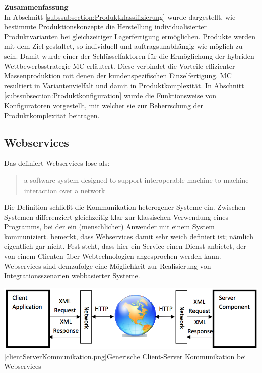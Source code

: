 \documentclass[12pt,a4paper,bibliography=totocnumbered,listof=totoc]{scrartcl}
\begin{document}
\textbf{Zusammenfassung}\\
In Abschnitt \ref{subssubsection:Produktklassifizierung} wurde dargestellt, wie bestimmte Produktionskonzepte die Herstellung individualisierter Produktvarianten bei gleichzeitiger Lagerfertigung ermöglichen. Produkte werden mit dem Ziel gestaltet, so individuell und auftragsunabhängig wie möglich zu sein. Damit wurde einer der Schlüsselfaktoren für die Ermöglichung der hybriden Wettbewerbsstrategie \ac{MC} erläutert. Diese verbindet die Vorteile effizienter Massenproduktion mit denen
der kundenspezifischen Einzelfertigung\citep{piller98}. \ac{MC} resultiert in Variantenvielfalt und damit in Produktkomplexität. In Abschnitt \ref{subssubsection:Produktkonfiguration} wurde die Funktionsweise von Konfiguratoren vorgestellt, mit welcher sie zur Beherrschung der Produktkomplexität beitragen.


\pagebreak
\subsection{Webservices}
\label{subsection:Webservices}

Das \citet	{w3c04} definiert Webservices lose als:

\begin{quote}
\glqq [...] a software system designed to support interoperable machine-to-machine interaction over a network\grqq
\end{quote}

Die Definition schließt die Kommunikation heterogener Systeme ein. \glqq Zwischen Systemen\grqq{} differenziert gleichzeitig klar zur klassischen Verwendung eines Programms, bei der ein (menschlicher) Anwender mit einem System kommuniziert. \citet{tilkov11} bemerkt, dass Webservices damit sehr weich definiert ist; \glqq nämlich eigentlich gar nicht\grqq{}. Fest steht, dass hier ein Service einen Dienst anbietet, der von einem Clienten über Webtechnologien angesprochen werden kann. Webservices sind demzufolge eine Möglichkeit zur Realisierung von Integrationsszenarien webbasierter Systeme.

\vspace{1em}
\begin{minipage}{\linewidth}
	\centering
	\includegraphics[width=0.7\linewidth]{Abbildungen/clientServerKommunikation.png}
	[clientServerKommunikation.png]{Generische Client-Server Kommunikation bei Webservices}
	\label{fig:clientServerKommunikation.png}
\end{minipage}
\vspace{1em}
\end{document}
